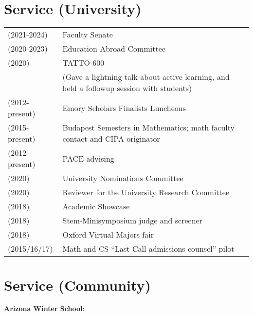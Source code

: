 \documentclass[margin,line]{res}
\begin{document}
\begin{resume}
\begin{tabular}{ll}
\end{tabular}


\section{\sc Service (University)}

\begin{tabular}{ll}
  (2021-2024) & Faculty Senate   \\
  (2020-2023) & Education Abroad Committee   \\
  (2020) & TATTO 600 \\
         & (Gave a lightning talk about active learning, and held a followup session with students)  \\    
  (2012-present) & Emory Scholars Finalists Luncheons  \\  
  (2015-present) & Budapest Semesters in Mathematics; math faculty contact and CIPA originator   \\
  (2012-present) & PACE advising  \\
  (2020) & University Nominations Committee \\
  (2020) & Reviewer for the University Research Committee \\  
  (2018) & Academic Showcase   \\
  (2018) & Stem-Minisymposium judge and screener  \\
  (2018) & Oxford Virtual Majors fair  \\
  (2015/16/17) & Math and CS ``Last Call admissions counsel'' pilot    \\

\end{tabular}


\section{\sc Service (Community)}
\textbf{Arizona Winter School}:
  \vspace*{-.15in}
  

\end{resume}
\end{document}
